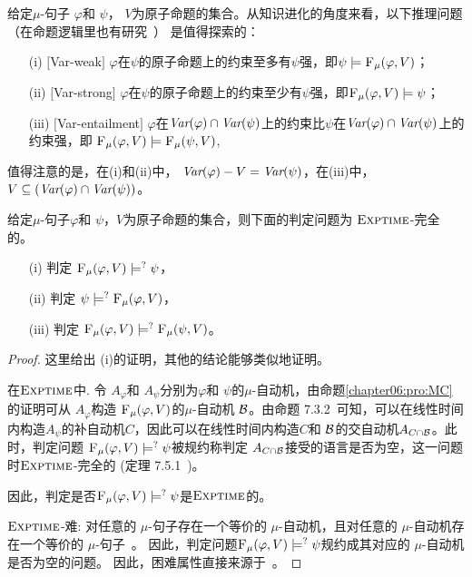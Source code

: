 给定$\mu$-句子 $\varphi$和 $\psi$， $V$为原子命题的集合。从知识进化的角度来看，以下推理问题（在命题逻辑里也有研究~\cite{wang2015forgetting}） 是值得探索的：

\begin{itemize}
	\item[(i)] $[$Var-weak$]$ $\varphi$在$\psi$的原子命题上的约束至多有$\psi$强，即$\psi\models {\textsc{F}_{\textsc{$\mu$}}}(\varphi, V)$；
	\item[(ii)] $[$Var-strong$]$ $\varphi$在$\psi$的原子命题上的约束至少有$\psi$强，即${\textsc{F}_{\textsc{$\mu$}}}(\varphi, V)\models \psi$；
	\item[(iii)] $[$Var-entailment$]$ $\varphi$在$\textit{Var}(\varphi) \cap \textit{Var}(\psi)$上的约束比$\psi$在$\textit{Var}(\varphi) \cap \textit{Var}(\psi)$上的约束强，即 ${\textsc{F}_{\textsc{$\mu$}}}(\varphi, V) \models {\textsc{F}_{\textsc{$\mu$}}}(\psi, V)$,
\end{itemize}
值得注意的是，在(i)和(ii)中， $\textit{Var}(\varphi) - V = \textit{Var}(\psi)$，在(iii)中， $V \subseteq (\textit{Var}(\varphi) \cap \textit{Var}(\psi))$。

\begin{theorem}[Entailment]
	\label{thm:Ent}
	给定$\mu$-句子$\varphi$和 $\psi$，$V$为原子命题的集合，则下面的判定问题为 $\textsc{Exptime}$-完全的。
	\begin{itemize}
		\item[(i)] 判定  ${\textsc{F}_{\textsc{$\mu$}}}(\varphi, V ) \models^? \psi$，
		\item[(ii)] 判定  $\psi \models^? {\textsc{F}_{\textsc{$\mu$}}}(\varphi, V)$，
		\item[(iii)] 判定 ${\textsc{F}_{\textsc{$\mu$}}}(\varphi, V) \models^? {\textsc{F}_{\textsc{$\mu$}}}(\psi, V)$。
	\end{itemize}
\end{theorem}
\begin{proof}
	这里给出 (i)的证明，其他的结论能够类似地证明。
	
	
	在$\textsc{Exptime}$中. 令 $A_{\varphi}$和 $A_{\psi}$分别为$\varphi$和 $\psi$的$\mu$-自动机，由命题\ref{chapter06:pro:MC}的证明可从 $A_{\varphi}$构造 ${\textsc{F}_{\textsc{$\mu$}}}(\varphi, V )$的$\mu$-自动机 ${\cal B}$。由命题 7.3.2~\cite{comon1997tree}可知，可以在线性时间内构造$A_\psi$的补自动机$C$，因此可以在线性时间内构造$C$和 ${\cal B}$的交自动机$A_{C \cap {\cal B}}$。此时，判定问题 ${\textsc{F}_{\textsc{$\mu$}}}(\varphi, V ) \models^? \psi$被规约称判定 $A_{C \cap {\cal B}}$接受的语言是否为空，这一问题时$\textsc{Exptime}$-完全的 (定理 7.5.1~\cite{comon1997tree})。
	
	因此，判定是否${\textsc{F}_{\textsc{$\mu$}}}(\varphi, V ) \models^? \psi$是$\textsc{Exptime}$的。 
	
	$\textsc{Exptime}$-难: 对任意的 $\mu$-句子存在一个等价的 $\mu$-自动机，且对任意的 $\mu$-自动机存在一个等价的 $\mu$-句子~\cite{bradfield2018mu}。
因此，判定问题${\textsc{F}_{\textsc{$\mu$}}}(\varphi, V ) \models^? \psi$规约成其对应的 $\mu$-自动机是否为空的问题。
	因此，困难属性直接来源于~\cite{bradfield2018mu,comon1997tree}。
\end{proof}

